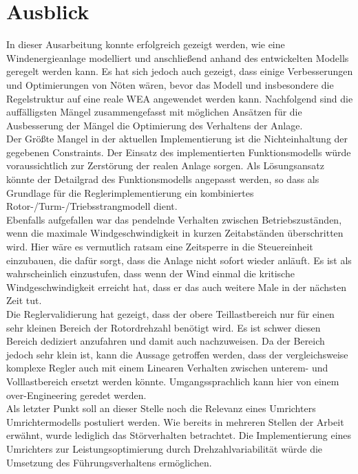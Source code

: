 \section{Ausblick} \label{ausblick}

In dieser Ausarbeitung konnte erfolgreich gezeigt werden, wie eine Windenergieanlage modelliert und anschließend anhand des entwickelten Modells geregelt werden kann. Es hat sich jedoch auch gezeigt, dass einige Verbesserungen und Optimierungen von Nöten wären, bevor das Modell und insbesondere die Regelstruktur auf eine reale WEA angewendet werden kann. Nachfolgend sind die auffälligsten Mängel zusammengefasst mit möglichen Ansätzen für die Ausbesserung der Mängel \bzw die Optimierung des Verhaltens der Anlage.\\

Der Größte Mangel in der aktuellen Implementierung ist die Nichteinhaltung der gegebenen Constraints. Der Einsatz des implementierten Funktionsmodells würde voraussichtlich zur Zerstörung der realen Anlage sorgen. Als Lösungsansatz könnte der Detailgrad des Funktionsmodells angepasst werden, so dass als Grundlage für die Reglerimplementierung ein kombiniertes Rotor-/Turm-/Triebsstrangmodell dient.\\

Ebenfalls aufgefallen war das pendelnde Verhalten zwischen Betriebszuständen, wenn die maximale Windgeschwindigkeit in kurzen Zeitabständen überschritten wird. Hier wäre es vermutlich ratsam eine Zeitsperre in die Steuereinheit einzubauen, die dafür sorgt, dass die Anlage nicht sofort wieder anläuft. Es ist als wahrscheinlich einzustufen, dass wenn der Wind einmal die kritische Windgeschwindigkeit erreicht hat, dass er das auch weitere Male in der nächsten Zeit tut.\\

Die Reglervalidierung hat gezeigt, dass der obere Teillastbereich nur für einen sehr kleinen Bereich der Rotordrehzahl benötigt wird. Es ist schwer diesen Bereich dediziert anzufahren und damit auch nachzuweisen. Da der Bereich jedoch sehr klein ist, kann die Aussage getroffen werden, dass der vergleichsweise komplexe Regler auch mit einem Linearen Verhalten zwischen unterem- und Volllastbereich ersetzt werden könnte. Umgangssprachlich kann hier von einem over-Engineering geredet werden.\\

Als letzter Punkt soll an dieser Stelle noch die Relevanz eines Umrichters \bzw Umrichtermodells postuliert werden. Wie bereits in mehreren Stellen der Arbeit erwähnt, wurde lediglich das Störverhalten betrachtet. Die Implementierung eines Umrichters zur Leistungsoptimierung durch Drehzahlvariabilität würde die Umsetzung des Führungsverhaltens ermöglichen.